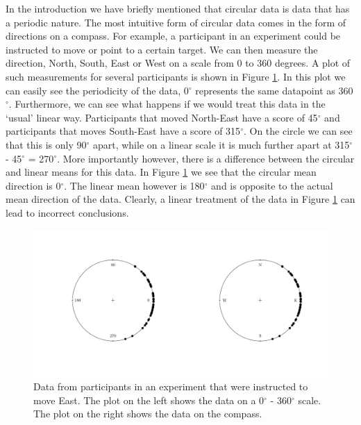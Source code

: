 \documentclass[11pt,]{article}
\begin{document}
In the introduction we have briefly mentioned that circular data is data
that has a periodic nature. The most intuitive form of circular data
comes in the form of directions on a compass. For example, a participant
in an experiment could be instructed to move or point to a certain
target. We can then measure the direction, North, South, East or West on
a scale from 0 to 360 degrees. A plot of such measurements for several
participants is shown in Figure \ref{plotdir}. In this plot we can
easily see the periodicity of the data, 0\(^\circ\) represents the same
datapoint as 360\(^\circ\). Furthermore, we can see what happens if we
would treat this data in the `usual' linear way. Participants that moved
North-East have a score of 45\(^\circ\) and participants that moves
South-East have a score of 315\(^\circ\). On the circle we can see that
this is only 90\(^\circ\) apart, while on a linear scale it is much
further apart at 315\(^\circ\) - 45\(^\circ\) = 270\(^\circ\). More
importantly however, there is a difference between the circular and
linear means for this data. In Figure \ref{plotdir} we see that the
circular mean direction is 0\(^\circ\). The linear mean however is
180\(^\circ\) and is opposite to the actual mean direction of the data.
Clearly, a linear treatment of the data in Figure \ref{plotdir} can lead
to incorrect conclusions.

\begin{figure}
        \centering

\includegraphics[width=\textwidth]{plotdir.pdf}

         \caption{Data from participants in an experiment that were instructed to move East. The plot on the left shows the data on a 0$^\circ$ - 360$^\circ$ scale. The plot on the right shows the data on the compass.}
        \label{plotdir}
\end{figure}
\end{document}
